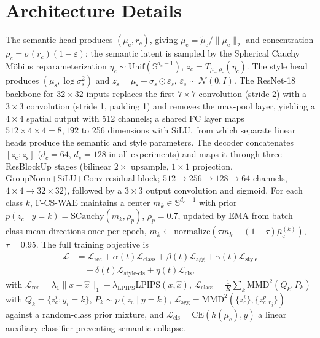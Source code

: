 \documentclass[10pt,letterpaper]{article}
\newcommand{\ours}{F-CS-WAE}
\newcommand{\zc}{z_{\mathrm{c}}}
\newcommand{\zs}{z_{\mathrm{s}}}
\newcommand{\muc}{\mu_{\mathrm{c}}}
\newcommand{\mus}{\mu_{\mathrm{s}}}
\newcommand{\Sph}{\mathbb{S}}
\newcommand{\MMD}{\mathrm{MMD}}
\newcommand{\CE}{\mathrm{CE}}
\newcommand{\SCauchy}{\mathrm{SCauchy}}
\begin{document}
\section{Architecture Details}
\label{app:arch}

The semantic head produces $(\tilde\muc,r_c)$, giving
$\muc=\tilde\muc/\|\tilde\muc\|_2$ and concentration
$\rho_c=\sigma(r_c)(1-\varepsilon)$; the semantic latent is sampled by the
Spherical Cauchy M\"obius reparameterization $\eta_c\sim\mathrm{Unif}(\Sph^{d_c-1})$,
$\zc=T_{\muc,\rho_c}(\eta_c)$. The style head produces $(\mus,\log\sigma_s^2)$
and $\zs=\mus+\sigma_s\odot\varepsilon_s$, $\varepsilon_s\sim\mathcal N(0,I)$.
The ResNet-18 backbone for $32\times32$ inputs replaces the first
$7\times7$ convolution (stride 2) with a $3\times3$ convolution (stride 1,
padding 1) and removes the max-pool layer, yielding a $4\times4$ spatial
output with 512 channels; a shared FC layer maps
$512\times4\times4{=}8{,}192$ to 256 dimensions with SiLU, from which
separate linear heads produce the semantic and style parameters. The
decoder concatenates $[\zc;\zs]$ ($d_c{=}64$, $d_s{=}128$ in all
experiments) and maps it through three ResBlockUp stages (bilinear
$2\times$ upsample, $1\times1$ projection, GroupNorm+SiLU+Conv residual
block; $512{\to}256{\to}128{\to}64$ channels, $4\times4\to32\times32$),
followed by a $3\times3$ output convolution and sigmoid. For each class
$k$, \ours{} maintains a center $m_k\in\Sph^{d_c-1}$ with prior
$p(\zc\mid y{=}k)=\SCauchy(m_k,\rho_p)$, $\rho_p{=}0.7$, updated by EMA from
batch class-mean directions once per epoch,
$m_k\leftarrow\mathrm{normalize}(\tau m_k+(1-\tau)\bar\muc^{(k)})$,
$\tau{=}0.95$. The full training objective is
\begin{align}
  \mathcal{L} &= \mathcal{L}_{\mathrm{rec}} + \alpha(t)\mathcal{L}_{\mathrm{class}}
   + \beta(t)\mathcal{L}_{\mathrm{agg}} + \gamma(t)\mathcal{L}_{\mathrm{style}} \nonumber\\
  &\quad + \delta(t)\mathcal{L}_{\mathrm{style\text{-}cls}} + \eta(t)\mathcal{L}_{\mathrm{cls}},
\end{align}
with $\mathcal{L}_{\mathrm{rec}}=\lambda_1\|x-\hat x\|_1+\lambda_{\mathrm{LPIPS}}\mathrm{LPIPS}(x,\hat x)$,
$\mathcal{L}_{\mathrm{class}}=\frac1K\sum_k\MMD^2(Q_k,P_k)$ with
$Q_k=\{\zc^i{:}y_i{=}k\}$, $P_k\sim p(\zc\mid y{=}k)$,
$\mathcal{L}_{\mathrm{agg}}=\MMD^2(\{\zc^i\},\{z_{c,r_j}^p\})$ against a
random-class prior mixture, and $\mathcal{L}_{\mathrm{cls}}=\CE(h(\muc),y)$
a linear auxiliary classifier preventing semantic collapse.
\end{document}
